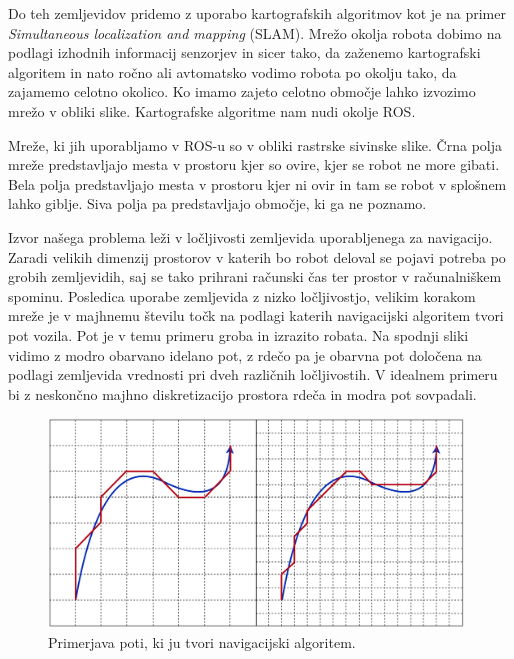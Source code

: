 \documentclass[10pt,a4paper]{article}
\begin{document}
Do teh zemljevidov pridemo z uporabo kartografskih algoritmov kot je na primer \textit{Simultaneous localization and mapping} (SLAM). Mrežo okolja robota dobimo na podlagi izhodnih informacij senzorjev in sicer tako, da zaženemo kartografski algoritem in nato ročno ali avtomatsko vodimo robota po okolju tako, da zajamemo celotno okolico. Ko imamo zajeto celotno območje lahko izvozimo mrežo v obliki slike. Kartografske algoritme nam nudi okolje ROS. 

Mreže, ki jih uporabljamo v ROS-u so v obliki rastrske sivinske slike. Črna polja mreže predstavljajo mesta v prostoru kjer so ovire, kjer se robot ne more gibati. Bela polja predstavljajo mesta v prostoru kjer ni ovir in tam se robot v splošnem lahko giblje. Siva polja pa predstavljajo območje, ki ga ne poznamo.

Izvor našega problema leži v ločljivosti zemljevida uporabljenega za navigacijo. Zaradi velikih dimenzij prostorov v katerih bo robot deloval se pojavi potreba po grobih zemljevidih, saj se tako prihrani računski čas ter prostor v računalniškem spominu. Posledica uporabe zemljevida z nizko ločljivostjo, velikim korakom mreže je v majhnemu številu točk na podlagi katerih navigacijski algoritem tvori pot vozila. Pot je v temu primeru groba in izrazito robata. Na spodnji sliki vidimo z modro obarvano idelano pot, z rdečo pa je obarvna pot določena na podlagi zemljevida vrednosti pri dveh različnih ločljivostih. V idealnem primeru bi z neskončno majhno diskretizacijo prostora rdeča in modra pot sovpadali.

\begin{figure}[H]
	\centering
	\includegraphics[width=11cm]{pic/pot.png}
	\caption{Primerjava poti, ki ju tvori navigacijski algoritem.}
	\label{fig:slika}
\end{figure}

\end{document}
